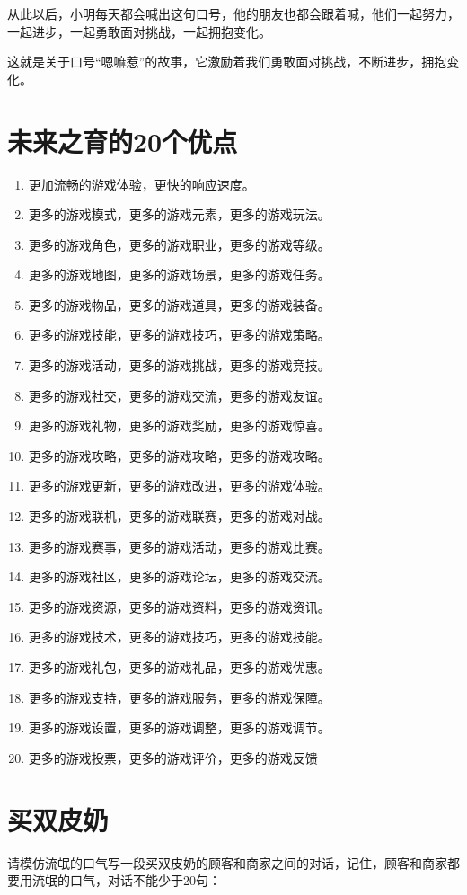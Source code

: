 \documentclass[titlepage,oneside]{ctexbook}
\begin{document}
从此以后，小明每天都会喊出这句口号，他的朋友也都会跟着喊，他们一起努力，一起进步，一起勇敢面对挑战，一起拥抱变化。

这就是关于口号“嗯嘛惹”的故事，它激励着我们勇敢面对挑战，不断进步，拥抱变化。

\chapter{未来之育的20个优点}
\begin{enumerate}
\item 更加流畅的游戏体验，更快的响应速度。
\item 更多的游戏模式，更多的游戏元素，更多的游戏玩法。
\item 更多的游戏角色，更多的游戏职业，更多的游戏等级。
\item 更多的游戏地图，更多的游戏场景，更多的游戏任务。
\item 更多的游戏物品，更多的游戏道具，更多的游戏装备。
\item 更多的游戏技能，更多的游戏技巧，更多的游戏策略。
\item 更多的游戏活动，更多的游戏挑战，更多的游戏竞技。
\item 更多的游戏社交，更多的游戏交流，更多的游戏友谊。
\item 更多的游戏礼物，更多的游戏奖励，更多的游戏惊喜。
\item 更多的游戏攻略，更多的游戏攻略，更多的游戏攻略。
\item 更多的游戏更新，更多的游戏改进，更多的游戏体验。
\item 更多的游戏联机，更多的游戏联赛，更多的游戏对战。
\item 更多的游戏赛事，更多的游戏活动，更多的游戏比赛。
\item 更多的游戏社区，更多的游戏论坛，更多的游戏交流。
\item 更多的游戏资源，更多的游戏资料，更多的游戏资讯。
\item 更多的游戏技术，更多的游戏技巧，更多的游戏技能。
\item 更多的游戏礼包，更多的游戏礼品，更多的游戏优惠。
\item 更多的游戏支持，更多的游戏服务，更多的游戏保障。
\item 更多的游戏设置，更多的游戏调整，更多的游戏调节。
\item 更多的游戏投票，更多的游戏评价，更多的游戏反馈
\end{enumerate}

\chapter{买双皮奶}
请模仿流氓的口气写一段买双皮奶的顾客和商家之间的对话，记住，顾客和商家都要用流氓的口气，对话不能少于20句：
\end{document}

